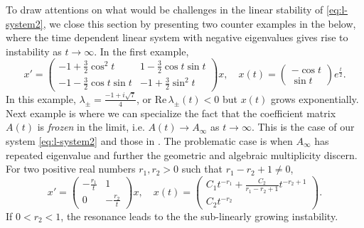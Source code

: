 \documentclass[a4paper,11pt]{article}
\theoremstyle{remark}
\begin{document}
To draw attentions on what would be challenges in the linear stability of \eqref{eq:l-system2}, we close this section by presenting two counter examples in the below, where the time dependent linear system with negative eigenvalues gives rise to instability as $t \rightarrow \infty$. In the first example, 
$$ 
x'=\left(\begin{array}{cc} -1 + \frac{3}{2}\cos^2 t & 1-\frac{3}{2}\cos t \sin t \\ -1 -\frac{3}{2}\cos t \sin t & -1 + \frac{3}{2}\sin^2 t \end{array}\right)x, \quad x(t) = \left(\begin{array}{c} -\cos t\\ \sin t \end{array}\right) e^{\tfrac{t}{2}}.$$
In this example, $\lambda_\pm = \tfrac{-1 + i\sqrt{7}}{4}$, or $\textrm{Re}\, \lambda_\pm(t)<0$ but $x(t)$ grows exponentially. Next example is where we can specialize the fact that the coefficient matrix $A(t)$ is {\it frozen} in the limit, i.e. $A(t) \rightarrow A_\infty$ as $t\rightarrow \infty$. This is the case of our system \eqref{eq:l-system2} and those in \cite{FM87}. The problematic case is when $A_\infty$ has repeated eigenvalue and further the geometric and algebraic multiplicity discern. For two positive real numbers $r_1, r_2>0$ such that $r_1-r_2+1\ne0$,
$$ 
x'=\left(\begin{array}{cc} -\frac{r_1}{t} & 1 \\ 0 & -\frac{r_2}{t}\end{array}\right)x, \quad x(t) = \left(\begin{array}{c} C_1 t^{-r_1} + \frac{C_2}{r_1-r_2+1} t^{-r_2+1}\\ C_2t^{-r_2}\end{array}\right).$$
If $0<r_2<1$, the resonance leads to the the sub-linearly growing instability. %
\end{document}
